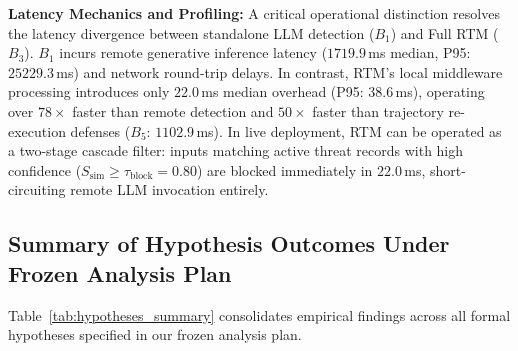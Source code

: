 \documentclass[conference]{IEEEtran}
\begin{document}
\noindent\textbf{Latency Mechanics and Profiling:}
A critical operational distinction resolves the latency divergence between standalone LLM detection ($B_1$) and Full RTM ($B_3$). $B_1$ incurs remote generative inference latency ($1719.9$\,ms median, P95: $25229.3$\,ms) and network round-trip delays. In contrast, RTM's local middleware processing introduces only $22.0$\,ms median overhead (P95: $38.6$\,ms), operating over $78\times$ faster than remote detection and $50\times$ faster than trajectory re-execution defenses ($B_5$: $1102.9$\,ms). In live deployment, RTM can be operated as a two-stage cascade filter: inputs matching active threat records with high confidence ($S_{\text{sim}} \ge \tau_{\text{block}} = 0.80$) are blocked immediately in $22.0$\,ms, short-circuiting remote LLM invocation entirely.

\subsection{Summary of Hypothesis Outcomes Under Frozen Analysis Plan}
Table~\ref{tab:hypotheses_summary} consolidates empirical findings across all formal hypotheses specified in our frozen analysis plan.
\end{document}
